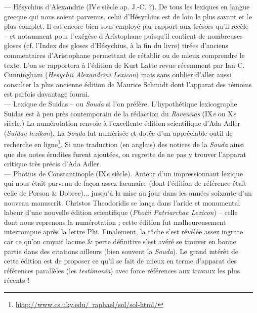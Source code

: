 \documentclass{book}%
\newcommand{\italique}[1]{\textit{#1}}%
\newcommand{\nieme}[1]{#1\italique{e}}%
\newcommand{\note}[1]{\footnote{#1}}
\begin{document}
--- Hésychius d'Alexandrie (\nieme{IV} siècle ap. J.-C. ?). De tous les lexiques en langue grecque qui nous soient parvenus, celui d'Hésychius est de loin le plus savant et le plus complet. Il est encore bien sous-employé par rapport aux trésors qu'il recèle -- et notamment pour l'exégèse d'Aristophane puisqu'il contient de nombreuses gloses (cf. l'Index des gloses d'Hésychius, à la fin du livre) tirées d'anciens commentaires d'Aristophane permettant de rétablir ou de mieux comprendre le texte. L'on se rapportera à l'édition de Kurt Latte revue récemment par Ian C. Cunningham (\italique{Hesychii Alexandrini Lexicon}) mais sans oublier d'aller aussi consulter la plus ancienne édition de Maurice Schmidt dont l'apparat des témoins est parfois davantage fourni.\\

--- Lexique de Suidas -- ou \italique{Souda} si l'on préfère. L'hypothétique lexicographe Suidas est à peu près contemporain de la rédaction du \italique{Ravennas} (\nieme{IX} ou \nieme{X} siècle.) La numérotation renvoie à l'excellente édition scientifique d'Ada Adler (\italique{Suidae lexikon}). La \italique{Souda} fut numérisée et dotée d'un appréciable outil de recherche en ligne\note{\href{http://www.cs.uky.edu/~raphael/sol/sol-html/}{http://www.cs.uky.edu/~raphael/sol/sol-html/}}. Si une traduction (en anglais) des notices de la \italique{Souda} ainsi que des notes érudites furent ajoutées, on regrette de ne pas y trouver l'apparat critique très précis d'Ada Adler.\\


--- Photius de Constantinople (\nieme{IX} siècle). Auteur d'un impressionnant lexique qui nous était parvenu de façon assez lacunaire (dont l'édition de référence était celle de Porson \& Dobree)... jusqu'à la mise au jour dans les années soixante d'un nouveau manuscrit. Christos Theodoridis se lança dans l'aride et monumental labeur d'une nouvelle édition scientifique (\italique{Photii Patriarchae Lexicon}) -- celle dont nous reprenons la numérotation ; cette édition fut malheureusement interrompue après la lettre Phi.
Finalement, la tâche s'est révélée assez ingrate car ce qu'on croyait lacune \& perte définitive s'est avéré se trouver en bonne partie dans des citations ailleurs (bien souvent la \italique{Souda}).
Le grand intérêt de cette édition est de proposer ce qu'il se fait de mieux en terme d'apparat des références parallèles (les \italique{testimonia}) avec force références aux travaux les plus récents !\\
\end{document}

